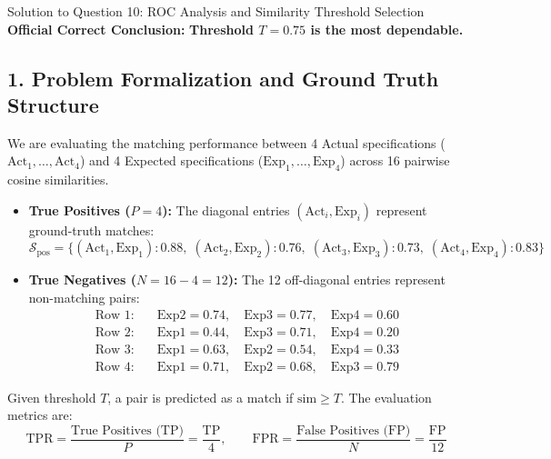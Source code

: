 \documentclass[11pt,a4paper]{article}
\begin{document}
\begin{solutionbox}{Solution to Question 10: ROC Analysis and Similarity Threshold Selection}
\textbf{Official Correct Conclusion:} \textbf{Threshold $T = 0.75$ is the most dependable.}

\medskip
\subsection*{1. Problem Formalization and Ground Truth Structure}
We are evaluating the matching performance between 4 Actual specifications ($\text{Act}_1, \dots, \text{Act}_4$) and 4 Expected specifications ($\text{Exp}_1, \dots, \text{Exp}_4$) across 16 pairwise cosine similarities.
\begin{itemize}[leftmargin=1.5em,itemsep=1pt]
    \item \textbf{True Positives ($P = 4$):} The diagonal entries $(\text{Act}_i, \text{Exp}_i)$ represent ground-truth matches:
    \begin{equation}
        \mathcal{S}_{\text{pos}} = \{(\text{Act}_1, \text{Exp}_1): 0.88,\; (\text{Act}_2, \text{Exp}_2): 0.76,\; (\text{Act}_3, \text{Exp}_3): 0.73,\; (\text{Act}_4, \text{Exp}_4): 0.83\}
    \end{equation}
    \item \textbf{True Negatives ($N = 16 - 4 = 12$):} The 12 off-diagonal entries represent non-matching pairs:
    \begin{align*}
        \text{Row 1:} & \quad \text{Exp2} = 0.74, \quad \text{Exp3} = 0.77, \quad \text{Exp4} = 0.60 \\
        \text{Row 2:} & \quad \text{Exp1} = 0.44, \quad \text{Exp3} = 0.71, \quad \text{Exp4} = 0.20 \\
        \text{Row 3:} & \quad \text{Exp1} = 0.63, \quad \text{Exp2} = 0.54, \quad \text{Exp4} = 0.33 \\
        \text{Row 4:} & \quad \text{Exp1} = 0.71, \quad \text{Exp2} = 0.68, \quad \text{Exp3} = 0.79
    \end{align*}
\end{itemize}

Given threshold $T$, a pair is predicted as a match if $\text{sim} \ge T$. The evaluation metrics are:
\begin{equation}
    \text{TPR} = \frac{\text{True Positives (TP)}}{P} = \frac{\text{TP}}{4}, \qquad
    \text{FPR} = \frac{\text{False Positives (FP)}}{N} = \frac{\text{FP}}{12}
\end{equation}


\end{solutionbox}
\end{document}
